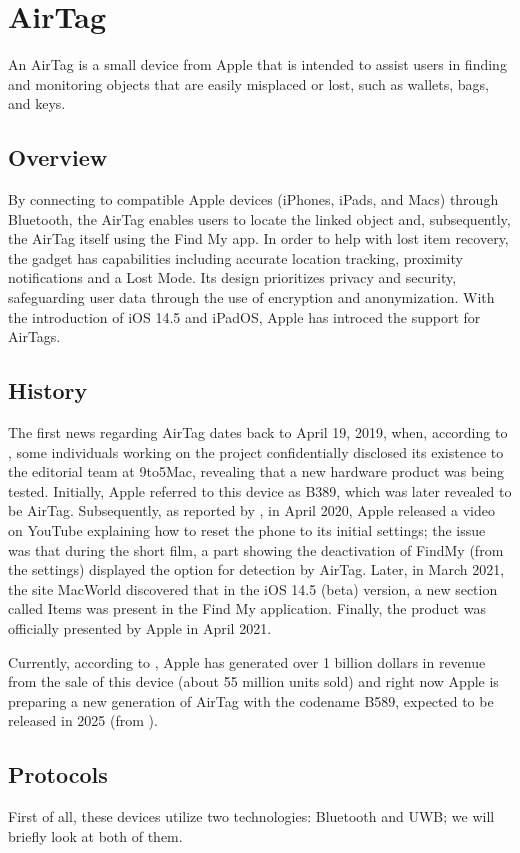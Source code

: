 \documentclass[english]{article}
\begin{document}
\section{AirTag}\label{sec:at}
An AirTag is a small device from Apple that is intended to assist users in finding and monitoring objects that are easily misplaced or lost, such as wallets, bags, and keys.
\subsection{Overview}
 By connecting to compatible Apple devices (iPhones, iPads, and Macs) through Bluetooth, the AirTag enables users to locate the linked object and, subsequently, the AirTag itself using the Find My app. In order to help with lost item recovery, the gadget has capabilities including accurate location tracking, proximity notifications and a Lost Mode. Its design prioritizes privacy and security, safeguarding user data through the use of encryption and anonymization. With the introduction of iOS 14.5 and iPadOS, Apple has introced the support for AirTags.
\subsection{History}
The first news regarding AirTag dates back to April 19, 2019, when, according to \cite{Rambo_2019}, some individuals working on the project confidentially disclosed its existence to the editorial team at 9to5Mac, revealing that a new hardware product was being tested. Initially, Apple referred to this device as B389, which was later revealed to be AirTag. Subsequently, as reported by \cite{TechCrunch}, in April 2020, Apple released a video on YouTube explaining how to reset the phone to its initial settings; the issue was that during the short film, a part showing the deactivation of FindMy (from the settings) displayed the option for detection by AirTag. Later, in March 2021, the site MacWorld \cite{Macworld} discovered that in the iOS 14.5 (beta) version, a new section called Items was present in the Find My application. Finally, the product was officially presented by Apple in April 2021. 

Currently, according to \cite{Kumar_2023}, Apple has generated over 1 billion dollars in revenue from the sale of this device (about 55 million units sold) and right now Apple is preparing a new generation of AirTag with the codename B589, expected to be released in 2025 (from \cite{Bloomberg}).

\subsection{Protocols}
First of all, these devices utilize two technologies: Bluetooth and UWB; we will briefly look at both of them.
\end{document}
